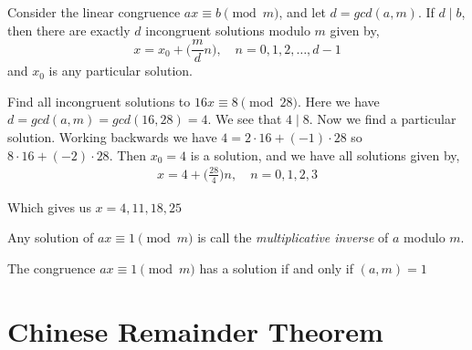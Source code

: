 \begin{corollary}
	Consider the linear congruence $ax \equiv b \pmod m$, and let $d = gcd(a, m)$. If $d \mid b$, then there are exactly $d$ incongruent solutions modulo $m$ given by, 
	$$ x = x_0 + \bigg (\frac{m}{d}n \bigg ), \quad  n= 0,1,2,\dots, d - 1$$ 
	and $x_0$ is any particular solution.
\end{corollary}
	
\begin{eg}
	Find all incongruent solutions to $16x \equiv 8 \pmod 28$. Here we have $d = gcd(a, m) =gcd(16, 28) = 4$. We see that $4 \mid 8$. Now we find a particular solution. Working backwards we have $4 = 2 \cdot 16+ (-1) \cdot 28$ so $8 \cdot 16 + (-2) \cdot 28$. Then $x_0 = 4$ is a solution, and we have all solutions given by,
	\begin{align*}
		x = 4 + \bigg(\frac{28}{4} \bigg)	n, \quad n = 0,1,2,3
	\end{align*}

	Which gives us $x = 4, 11, 18, 25$
\end{eg}

\begin{definition}
	Any solution of $ax \equiv 1 \pmod m$ is call the \emph{multiplicative inverse} of $a$ modulo $m$.
\end{definition}

\begin{corollary}
	The congruence $ax \equiv 1 \pmod m$ has a solution if and only if $(a, m) = 1$
\end{corollary}

\section{Chinese Remainder Theorem}

